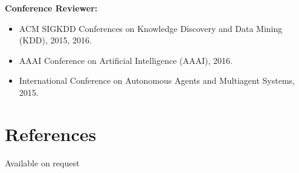 \documentclass[margin,line]{CV}
\begin{document}
\begin{resume}
{\bf Conference Reviewer:}
\begin{itemize}
\item ACM SIGKDD Conferences on Knowledge Discovery and Data Mining (KDD), 2015, 2016.
\item AAAI Conference on Artificial Intelligence (AAAI), 2016.
\item International Conference on Autonomous Agents and Multiagent Systems, 2015. 
\end{itemize}


\section{\sc References} Available on request

\end{resume}
\end{document}

